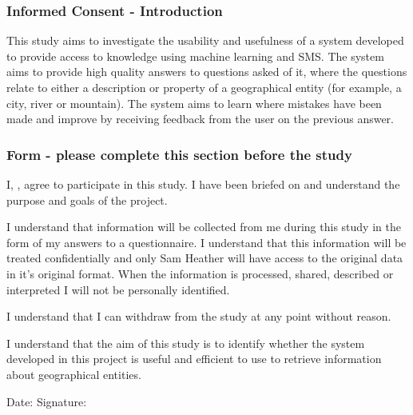 \documentclass{article}
\begin{document}
{\parindent0pt
\subsubsection*{Informed Consent - Introduction}
This study aims to investigate the usability and usefulness of a system developed to provide access to knowledge using machine learning and SMS.  The system aims to provide high quality answers to questions asked of it, where the questions relate to either a description or property of a geographical entity (for example, a city, river or mountain).  The system aims to learn where mistakes have been made and improve by receiving feedback from the user on the previous answer.  

\subsubsection*{Form - please complete this section before the study}
I, \textunderscore\textunderscore\textunderscore\textunderscore\textunderscore\textunderscore\textunderscore\textunderscore\textunderscore\textunderscore\textunderscore\textunderscore\textunderscore\textunderscore\textunderscore\textunderscore\textunderscore\textunderscore\textunderscore\textunderscore\textunderscore\textunderscore\textunderscore\textunderscore\textunderscore\textunderscore\textunderscore\textunderscore\textunderscore\textunderscore\textunderscore\textunderscore\textunderscore\textunderscore\textunderscore\textunderscore\textunderscore\textunderscore\textunderscore\textunderscore\textunderscore\textunderscore, agree to participate in this study.  I have been briefed on and understand the purpose and goals of the project.

I understand that information will be collected from me during this study in the form of my answers to a questionnaire.  I understand that this information will be treated confidentially and only Sam Heather will have access to the original data in it's original format.  When the information is processed, shared, described or interpreted I will not be personally identified.

I understand that I can withdraw from the study at any point without reason.

I understand that the aim of this study is to identify whether the system developed in this project is useful and efficient to use to retrieve information about geographical entities.

Date: \textunderscore\textunderscore\textunderscore\textunderscore\textunderscore\textunderscore\textunderscore\textunderscore\textunderscore\textunderscore\textunderscore\textunderscore\textunderscore\textunderscore\textunderscore\textunderscore\textunderscore\textunderscore\textunderscore\textunderscore\textunderscore
Signature: \textunderscore\textunderscore\textunderscore\textunderscore\textunderscore\textunderscore\textunderscore\textunderscore\textunderscore\textunderscore\textunderscore\textunderscore\textunderscore\textunderscore\textunderscore\textunderscore\textunderscore\textunderscore\textunderscore\textunderscore\textunderscore

}
\end{document}
